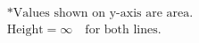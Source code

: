 \documentclass[preview]{standalone}
\begin{document}
\begin{align*}
\textrm{*Values shown on y-axis are area.} \\ \textrm{Height}=\infty \quad \textrm{for both lines.}
\end{align*}
\end{document}
